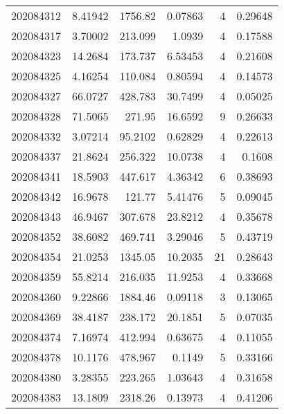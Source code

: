 \begin{tabular}{rrrrrr}
 202084312 &          8.41942 &     1756.82   &            0.07863 &           4 & 0.29648 \\
 202084317 &          3.70002 &      213.099  &            1.0939  &           4 & 0.17588 \\
 202084323 &         14.2684  &      173.737  &            6.53453 &           4 & 0.21608 \\
 202084325 &          4.16254 &      110.084  &            0.80594 &           4 & 0.14573 \\
 202084327 &         66.0727  &      428.783  &           30.7499  &           4 & 0.05025 \\
 202084328 &         71.5065  &      271.95   &           16.6592  &           9 & 0.26633 \\
 202084332 &          3.07214 &       95.2102 &            0.62829 &           4 & 0.22613 \\
 202084337 &         21.8624  &      256.322  &           10.0738  &           4 & 0.1608  \\
 202084341 &         18.5903  &      447.617  &            4.36342 &           6 & 0.38693 \\
 202084342 &         16.9678  &      121.77   &            5.41476 &           5 & 0.09045 \\
 202084343 &         46.9467  &      307.678  &           23.8212  &           4 & 0.35678 \\
 202084352 &         38.6082  &      469.741  &            3.29046 &           5 & 0.43719 \\
 202084354 &         21.0253  &     1345.05   &           10.2035  &          21 & 0.28643 \\
 202084359 &         55.8214  &      216.035  &           11.9253  &           4 & 0.33668 \\
 202084360 &          9.22866 &     1884.46   &            0.09118 &           3 & 0.13065 \\
 202084369 &         38.4187  &      238.172  &           20.1851  &           5 & 0.07035 \\
 202084374 &          7.16974 &      412.994  &            0.63675 &           4 & 0.11055 \\
 202084378 &         10.1176  &      478.967  &            0.1149  &           5 & 0.33166 \\
 202084380 &          3.28355 &      223.265  &            1.03643 &           4 & 0.31658 \\
 202084383 &         13.1809  &     2318.26   &            0.13973 &           4 & 0.41206 \\

\end{tabular}
